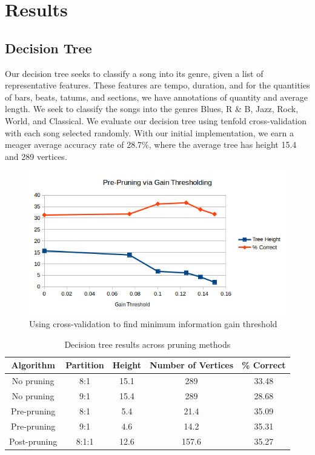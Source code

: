 \documentclass[11pt, twocolumn]{article}
\begin{document}
\section{Results}
\subsection{Decision Tree}
    Our decision tree seeks to classify a song into its genre, given a list of
representative features. These features are tempo, duration, and for the
quantities of bars, beats, tatums, and sections, we have annotations of
quantity and average length. We seek to classify the songs into the genres
Blues, R \& B, Jazz, Rock, World, and Classical. We evaluate our decision tree
using tenfold cross-validation with each song selected randomly. With our
initial implementation, we earn a meager average accuracy rate of 28.7\%, where
the average tree has height 15.4 and 289 vertices.

\begin{figure}
  \centering
  \includegraphics[width=\linewidth]{resources/gain.png}
  \caption{Using cross-validation to find minimum information gain threshold}
  \label{fig:graph}
\end{figure}

\begin{table}
  \begin{center}
    \begin{tabular}{ |c|c|c|c|c| }
      \hline
      Algorithm & Partition & Height & Number of Vertices & \% Correct \\
      \hline
      No pruning & 8:1 & 15.1 & 289 & 33.48 \\
      No pruning & 9:1 & 15.4 & 289 & 28.68 \\
      Pre-pruning & 8:1 & 5.4 & 21.4 & 35.09 \\
      Pre-pruning & 9:1 & 4.6 & 14.2 & 35.31 \\
      Post-pruning & 8:1:1 & 12.6 & 157.6 & 35.27 \\
      \hline
    \end{tabular}
  \end{center}
  \caption{Decision tree results across pruning methods}
  \label{tab:results}
\end{table}
\end{document}

